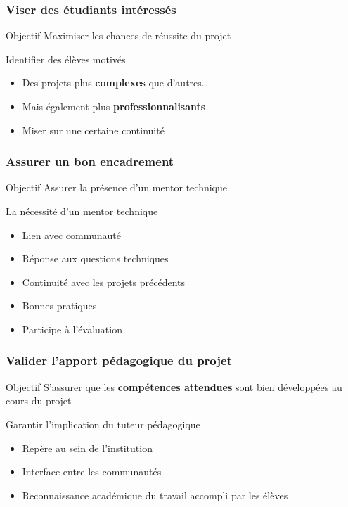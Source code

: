 \documentclass[hyperref,french,usenames,xcolor=dvipsnames]{beamer}
\begin{document}
\frame
{
  \frametitle{Viser des étudiants intéressés}

\begin{alertblock}{Objectif}
Maximiser les chances de réussite du projet 
\end{alertblock}

\begin{block}{Identifier des élèves motivés}
\begin{itemize}
\item Des projets plus \textbf{complexes} que d'autres…
\item Mais également plus \textbf{professionnalisants}
\item Miser sur une certaine continuité
\end{itemize}
\end{block}

}

\frame
{
  \frametitle{Assurer un bon encadrement}

\begin{alertblock}{Objectif}
Assurer la présence d'un mentor technique
\end{alertblock}

\begin{block}{La nécessité d'un mentor technique}
\begin{itemize}
\item Lien avec communauté
\item Réponse aux questions techniques
\item Continuité avec les projets précédents
\item Bonnes pratiques
\item Participe à l'évaluation
\end{itemize}
\end{block}

}

\frame
{
  \frametitle{Valider l'apport pédagogique du projet}

\begin{alertblock}{Objectif}
S'assurer que les \textbf{compétences attendues} sont bien développées au cours du projet
\end{alertblock}

\begin{block}{Garantir l'implication du tuteur pédagogique}
\begin{itemize}
\item Repère au sein de l'institution 
\item Interface entre les communautés 
\item Reconnaissance académique du travail accompli par les élèves
\end{itemize}
\end{block}

}
\end{document}
